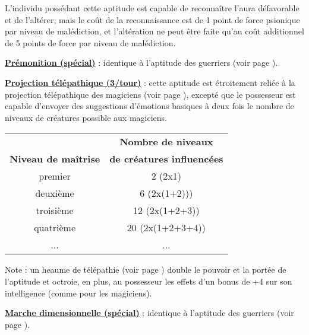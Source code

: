 \bigskip

L'individu possédant cette aptitude est capable de reconnaître l'aura défavorable et de l'altérer, mais le coût de la reconnaissance est de 1 point de force psionique par niveau de malédiction, et l'altération ne peut être faite qu'au coût additionnel de 5 points de force par niveau de malédiction.

\bigskip

\textbf{\uline{Prémonition (spécial)}} : identique à l'aptitude des guerriers (voir page \pageref{guerrier-premonition}).

\bigskip

\textbf{\uline{Projection télépathique (3/tour)}} : cette aptitude est étroitement reliée à la projection télépathique des magiciens (voir page \pageref{magicien-projection-telepathique}), excepté que le possesseur est capable d'envoyer des suggestions d'émotions basiques à deux fois le nombre de niveaux de créatures possible aux magiciens.

\bigskip

\begin{tabular}{cc}
                                &\textbf{Nombre de niveaux} \\
\textbf{Niveau de maîtrise}      & \textbf{de créatures influencées}\\
premier     & 2 (2x1)            \\
deuxième    & 6 (2x(1+2)))       \\
troisième   & 12 (2x(1+2+3))     \\
quatrième   & 20 (2x(1+2+3+4))   \\
...         & ...           \\
\end{tabular}

\bigskip

Note : un heaume de télépathie (voir page \pageref{objet-heaume-telepathie}) double le pouvoir et la portée de l'aptitude et octroie, en plus, au possesseur les effets d'un bonus de +4 sur son intelligence (comme pour les magiciens).

\bigskip

\textbf{\uline{Marche dimensionnelle (spécial)}} : identique à l'aptitude des guerriers (voir page \pageref{guerrier-marche-dimensionnelle}).


